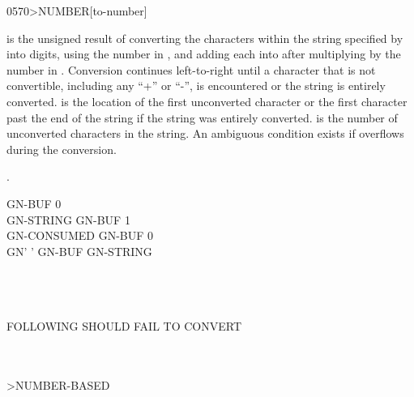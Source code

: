 \begin{worddef}[toNUMBER]{0570}{>NUMBER}[to-number]
\item {}

	 is the unsigned result of converting the characters
	within the string specified by  into digits,
	using the number in , and adding each into 
	after multiplying  by the number in .
	Conversion continues left-to-right until a character that is not
	convertible, including any ``+'' or ``-'', is encountered or the
	string is entirely converted.
	 is the location of the first unconverted character
	or the first character past the end of the string if the string was
	entirely converted.  is the number of unconverted
	characters in the string. An ambiguous condition exists if
	 overflows during the conversion.

\see {}.

	\begin{testing} %
		\ttfamily
		 GN-BUF 0  \\
		\word{:} GN-STRING	 GN-BUF 1 \word{;} \\
		\word{:} GN-CONSUMED GN-BUF  0 \word{;} \\
		\word{:} GN'		 \word{[CHAR]} '    GN-BUF   GN-STRING \word{;}

		 \\
		 \\
		 \\
		 FOLLOWING SHOULD FAIL TO CONVERT \\
		 \\
		 \\

		\word{:} >NUMBER-BASED \\
		\tab {}    \word{!}    \word{!} \word{;}

		 \\
		 \\
		 \\
		 \\
		 \\


\end{testing}
\end{worddef}
